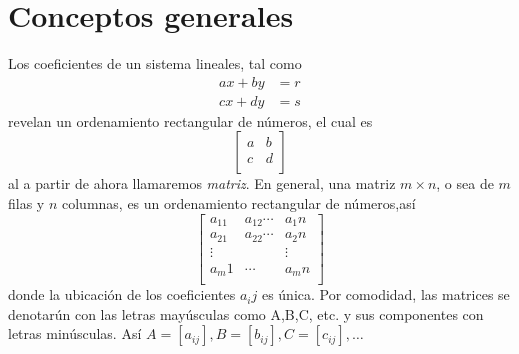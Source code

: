 \documentclass[b5paper, 11pt]{book}
\newcommand{\0}{\mathbf{0}}
\theoremstyle{estiloB}
\theoremstyle{estiloC}
\theoremstyle{estiloD}
\theoremstyle{estiloE}
\begin{document}
\section{Conceptos generales}
Los coeficientes de un sistema lineales, tal como
\begin{align*}
ax + by &= r \\
cx + dy &= s 
\end{align*}
revelan un ordenamiento rectangular de n\'{u}meros, el cual es 
\[\begin{bmatrix}
a & b \\
c & d \\
\end{bmatrix}\]
al a partir de ahora llamaremos \textit{matriz}. En general, una matriz $m \times n$, o sea de $m$ filas y $n$ columnas, es un ordenamiento rectangular de n\'{u}meros,así
\[\begin{bmatrix}
a_11 & a_12  \cdots & a_1n \\
a_21 & a_22  \cdots & a_2n \\
\vdots &  & \vdots   \\
a_m1  & \cdots   & a_mn    \\    
\end{bmatrix}\]
donde la ubicaci\'{o}n de los coeficientes $a_ij$ es \'{u}nica. Por comodidad, las matrices se denotar\'{u}n con las letras may\'{u}sculas como A,B,C, etc. y sus componentes con letras min\'{u}sculas. As\'{i} $A = [a_{ij}], B = [b_{ij}], C = [c_{ij}], \ldots$
\end{document}
